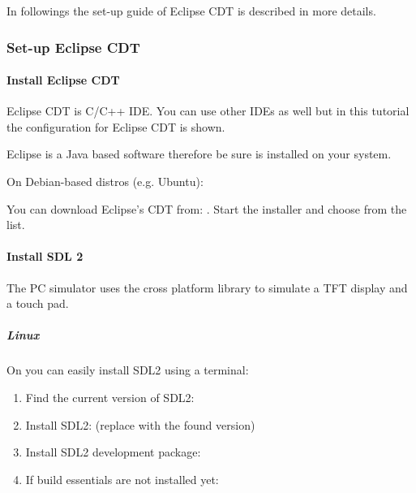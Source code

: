 \documentclass[letterpaper,10pt,english]{sphinxmanual}
\begin{document}
In followings the set-up guide of Eclipse CDT is described in more details.


\subsubsection{Set-up Eclipse CDT}
\label{\detokenize{get-started/pc-simulator:set-up-eclipse-cdt}}

\paragraph{Install Eclipse CDT}
\label{\detokenize{get-started/pc-simulator:install-eclipse-cdt}}
Eclipse CDT is C/C++ IDE. You can use other IDEs as well but in this tutorial the configuration for Eclipse CDT is shown.

Eclipse is a Java based software therefore be sure  is installed on your system.

On Debian-based distros (e.g. Ubuntu): 

You can download Eclipse’s CDT from: . Start the installer and choose  from the list.


\paragraph{Install SDL 2}
\label{\detokenize{get-started/pc-simulator:install-sdl-2}}
The PC simulator uses the  cross platform library to simulate a TFT display and a touch pad.


\subparagraph{Linux}
\label{\detokenize{get-started/pc-simulator:linux}}
On  you can easily install SDL2 using a terminal:
\begin{enumerate}
\def\theenumi{\arabic{enumi}}
\def\labelenumi{\theenumi .}
\makeatletter\def\p@enumii{\p@enumi \theenumi .}\makeatother
\item {} 
Find the current version of SDL2: 

\item {} 
Install SDL2:  (replace with the found version)

\item {} 
Install SDL2 development package: 

\item {} 
If build essentials are not installed yet: 

\end{enumerate}
\end{document}
